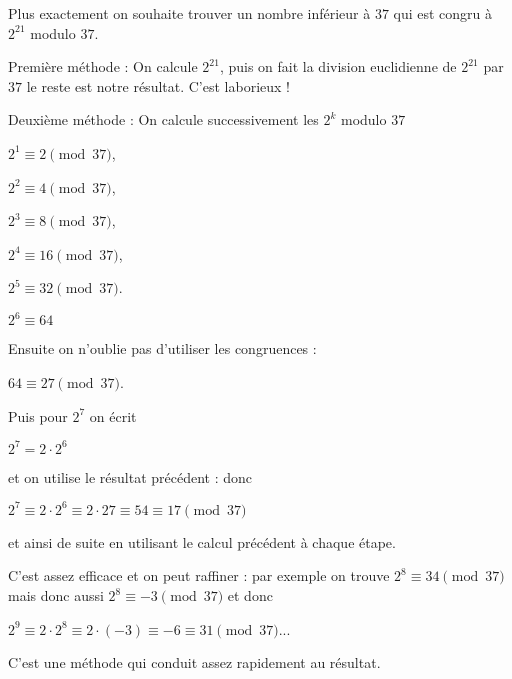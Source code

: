 Plus exactement on souhaite trouver un nombre inférieur à $37$ qui est congru à $2^{21}$ modulo ${37}$. 

\change

Première méthode : On calcule $2^{21}$, puis on fait la division euclidienne de $2^{21}$ par $37$ le reste est notre résultat.
C'est laborieux !

\change

Deuxième  méthode : On calcule successivement les $2^k$ modulo $37$ 

\change

$2^1 \equiv 2 \pmod {37}$,

\change

$2^2 \equiv 4 \pmod {37}$, 

\change

$2^3 \equiv 8 \pmod {37}$,


\change

$2^4 \equiv 16 \pmod {37}$,

\change

$2^5 \equiv 32 \pmod {37}$. 

\change


$2^6 \equiv 64$

Ensuite on n'oublie pas d'utiliser les congruences :

\change

$64 \equiv 27 \pmod {37}$.

\change 

Puis pour $2^7$ on écrit

$2^7 = 2 \cdot 2^6$

et on utilise le résultat précédent :
donc

\change

\change

$2^7  \equiv 2 \cdot 2^6  \equiv 2 \cdot 27 \equiv 54 \equiv 17 \pmod {37}$ 


et ainsi de suite en utilisant le calcul précédent à chaque étape.

\change

C'est assez efficace et on peut raffiner : par exemple on trouve $2^{8} \equiv 34 \pmod {37}$
mais donc aussi $2^{8} \equiv -3 \pmod {37}$ et donc 

\change

\change


$2^9 \equiv 2 \cdot 2^8 \equiv 2 \cdot(-3) \equiv -6 \equiv 31 \pmod{37}$...

C'est une méthode qui conduit assez rapidement au résultat.

\change


